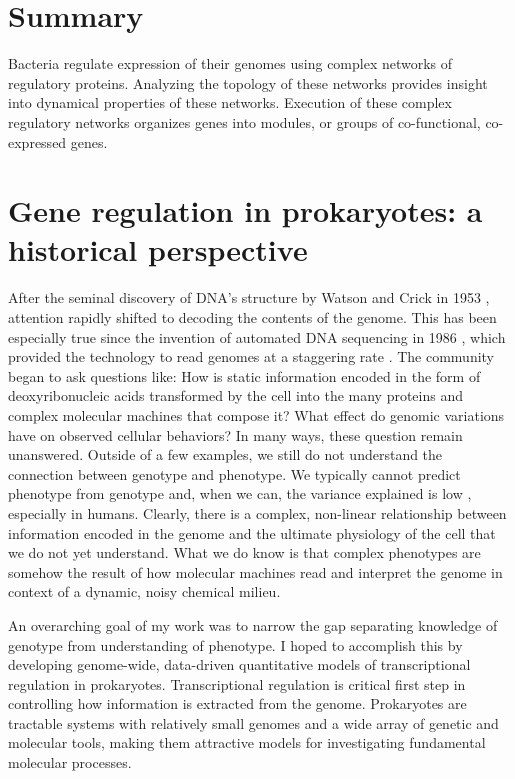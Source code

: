 \section{Summary}

Bacteria regulate expression of their genomes using complex networks of regulatory proteins. Analyzing the topology of these networks provides insight into dynamical properties of these networks. Execution of these complex regulatory networks organizes genes into modules, or groups of co-functional, co-expressed genes.

\section{Gene regulation in prokaryotes: a historical perspective}

After the seminal discovery of DNA's structure by Watson and Crick in 1953 \cite{watson_molecular_1953}, attention rapidly shifted to decoding the contents of the genome. This has been especially true since the invention of automated DNA sequencing in 1986 \cite{smith_fluorescence_1986}, which provided the technology to read genomes at a staggering rate \cite{check_hayden_technology:_2014}. The community began to ask questions like: How is static information encoded in the form of deoxyribonucleic acids transformed by the cell into the many proteins and complex molecular machines that compose it? What effect do genomic variations have on observed cellular behaviors? In many ways, these question remain unanswered. Outside of a few examples, we still do not understand the connection between genotype and phenotype. We typically cannot predict phenotype from genotype and, when we can, the variance explained is low \cite{manolio_finding_2009}, especially in humans.  Clearly, there is a complex, non-linear relationship between information encoded in the genome and the ultimate physiology of the cell that we do not yet understand. What we do know is that complex phenotypes are somehow the result of how molecular machines read and interpret the genome in context of a dynamic, noisy chemical milieu. 

An overarching goal of my work was to narrow the gap separating knowledge of genotype from understanding of phenotype. I hoped to accomplish this by developing genome-wide, data-driven quantitative models of transcriptional regulation in prokaryotes. Transcriptional regulation is critical first step in controlling how information is extracted from the genome.  Prokaryotes are tractable systems with relatively small genomes and a wide array of genetic and molecular tools, making them attractive models for investigating fundamental molecular processes. 

